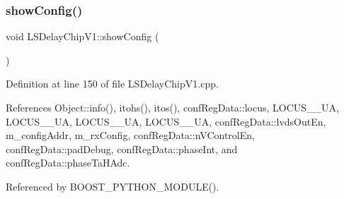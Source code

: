 \subsubsection{\texorpdfstring{show\+Config()}{showConfig()}}
{\footnotesize\ttfamily void L\+S\+Delay\+Chip\+V1\+::show\+Config (\begin{DoxyParamCaption}{ }\end{DoxyParamCaption})}



Definition at line 150 of file L\+S\+Delay\+Chip\+V1.\+cpp.



References Object\+::info(), itohs(), itos(), conf\+Reg\+Data\+::locus, L\+O\+C\+U\+S\+\_\+\_\+\+UA, L\+O\+C\+U\+S\+\_\+\_\+\+UA, L\+O\+C\+U\+S\+\_\+\_\+\+UA, L\+O\+C\+U\+S\+\_\+\_\+\+UA, conf\+Reg\+Data\+::lvds\+Out\+En, m\+\_\+config\+Addr, m\+\_\+rx\+Config, conf\+Reg\+Data\+::n\+V\+Control\+En, conf\+Reg\+Data\+::pad\+Debug, conf\+Reg\+Data\+::phase\+Int, and conf\+Reg\+Data\+::phase\+Ta\+H\+Adc.



Referenced by B\+O\+O\+S\+T\+\_\+\+P\+Y\+T\+H\+O\+N\+\_\+\+M\+O\+D\+U\+L\+E().


